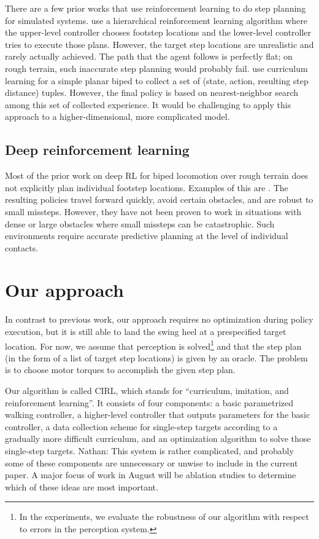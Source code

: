 \documentclass[a4paper]{article}
\newcommand{\nhatch}[1]{{\leavevmode\color{blue} Nathan: #1}}
\begin{document}
There are a few prior works that use reinforcement learning to do step planning for simulated systems.
\cite{peng2017deeploco} use a hierarchical reinforcement learning algorithm where the upper-level controller chooses footstep locations and the lower-level controller tries to execute those plans.
However, the target step locations are unrealistic and rarely actually achieved.
The path that the agent follows is perfectly flat; on rough terrain, such inaccurate step planning would probably fail.
\cite{karpathy2012curriculum} use curriculum learning for a simple planar biped to collect a set of (state, action, resulting step distance) tuples.
However, the final policy is based on nearest-neighbor search among this set of collected experience.
It would be challenging to apply this approach to a higher-dimensional, more complicated model.

\subsection{Deep reinforcement learning}

Most of the prior work on deep RL for biped locomotion over rough terrain does not explicitly plan individual footstep locations.
Examples of this are \cite{peng2018deepmimic, heess2017emergence, peng2016terrain}. The resulting policies travel forward quickly, avoid certain obstacles, and are robust to small missteps.
However, they have not been proven to work in situations with dense or large obstacles where small missteps can be catastrophic.
Such environments require accurate predictive planning at the level of individual contacts.

\section{Our approach}

In contrast to previous work, our approach requires no optimization during policy execution, but it is still able to land the swing heel at a prespecified target location.
For now, we assume that perception is solved\footnote{In the experiments, we evaluate the robustness of our algorithm with respect to errors in the perception system.} and that the step plan (in the form of a list of target step locations) is given by an oracle.
The problem is to choose motor torques to accomplish the given step plan.


Our algorithm is called CIRL, which stands for ``curriculum, imitation, and reinforcement learning''.
It consists of four components: a basic parametrized walking controller, a higher-level controller that outputs parameters for the basic controller, a data collection scheme for single-step targets according to a gradually more difficult curriculum, and an optimization algorithm to solve those single-step targets.
\nhatch{This system is rather complicated, and probably some of these components are unnecessary or unwise to include in the current paper. A major focus of work in August will be ablation studies to determine which of these ideas are most important.}
\end{document}
